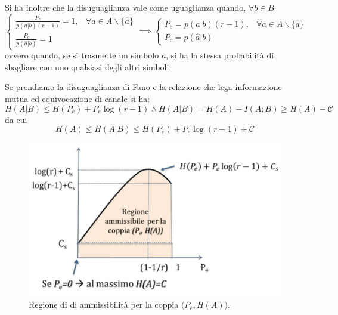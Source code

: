 Si ha inoltre che la disuguaglianza vale come uguaglianza quando, $\forall b \in B$
\begin{equation*}
\begin{cases}
\frac{P_e}{p(a|b)(r-1)} = 1, & \forall a \in A \backslash \{\hat{a}\}\\
\frac{P_c}{p(\hat{a}|b)} = 1
\end{cases} \implies 
\begin{cases}
P_e = p(a|b) (r-1), & \forall a \in A \backslash \{\hat{a}\} \\
P_c = p(\hat{a}|b)
\end{cases}
\end{equation*}
ovvero quando, se si trasmette un simbolo $a$, si ha la stessa probabilità di sbagliare con uno qualsiasi degli altri simboli.

Se prendiamo la disuguaglianza di Fano e la relazione che lega informazione mutua ed equivocazione di canale si ha:
\begin{equation*}
    H(A|B) \leq H(P_e) + P_e \log (r-1) \land H(A|B) = H(A) - I(A;B) \geq H(A) - \mathcal{C}
\end{equation*}
da cui
\begin{equation}
    H(A) \leq H(A|B) \leq H(P_e) + P_e \log (r-1) + \mathcal{C}
\end{equation}

\begin{figure}[H]
    \centering
    \includegraphics[scale=0.2]{img/equiv.jpg}
    \caption{Regione di di ammissibilit\`a per la coppia $\big ( P_e, H(A) \big )$.}
\end{figure}

